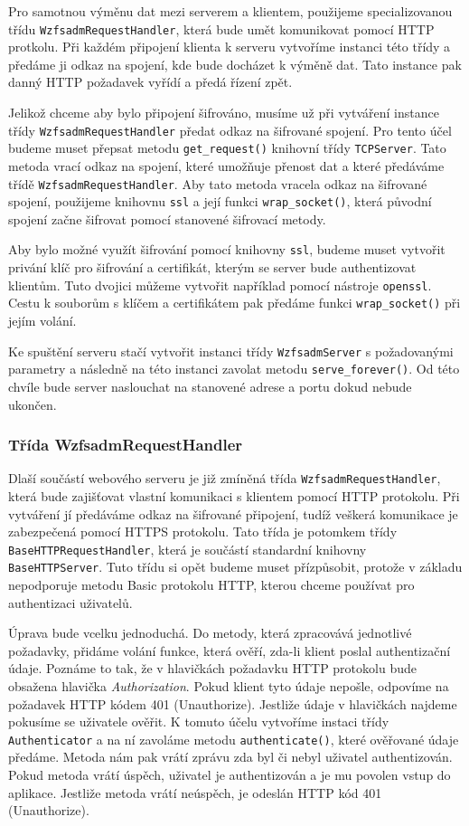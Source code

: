     Pro samotnou výměnu dat mezi serverem a klientem, použijeme specializovanou třídu \verb|WzfsadmRequestHandler|, která bude umět komunikovat pomocí HTTP protkolu. Při každém připojení klienta k serveru vytvoříme instanci této třídy a předáme ji odkaz na spojení, kde bude docházet k výměně dat. Tato instance pak danný HTTP požadavek vyřídí a předá řízení zpět.

    Jelikož chceme aby bylo připojení šifrováno, musíme už při vytváření instance třídy \verb|WzfsadmRequestHandler| předat odkaz na šifrované spojení. Pro tento účel budeme muset přepsat metodu \verb|get_request()| knihovní třídy \verb|TCPServer|. Tato metoda vrací odkaz na spojení, které umožňuje přenost dat a které předáváme třídě \verb|WzfsadmRequestHandler|. Aby tato metoda vracela odkaz na šifrované spojení, použijeme knihovnu \verb|ssl| a její funkci \verb|wrap_socket()|, která původní spojení začne šifrovat pomocí stanovené šifrovací metody.

    Aby bylo možné využít šifrování pomocí knihovny \verb|ssl|, budeme muset vytvořit privání klíč pro šifrování a certifikát, kterým se server bude authentizovat klientům. Tuto dvojici můžeme vytvořit například pomocí nástroje \verb|openssl|. Cestu k souborům s klíčem a certifikátem pak předáme funkci \verb|wrap_socket()| při jejím volání.

    Ke spuštění serveru stačí vytvořit instanci třídy \verb|WzfsadmServer| s požadovanými parametry a následně na této instanci zavolat metodu \verb|serve_forever()|. Od této chvíle bude server naslouchat na stanovené adrese a portu dokud nebude ukončen.


    \subsubsection{Třída WzfsadmRequestHandler}
    Dlaší součástí webového serveru je již zmíněná třída \verb|WzfsadmRequestHandler|, která bude zajišťovat vlastní komunikaci s klientem pomocí HTTP protokolu. Při vytváření jí předáváme odkaz na šifrované připojení, tudíž veškerá komunikace je zabezpečená pomocí HTTPS protokolu. Tato třída je potomkem třídy \verb|BaseHTTPRequestHandler|, která je součástí standardní knihovny \verb|BaseHTTPServer|. Tuto třídu si opět budeme muset přízpůsobit, protože v základu nepodporuje metodu Basic protokolu HTTP, kterou chceme používat pro authentizaci uživatelů.

    Úprava bude vcelku jednoduchá. Do metody, která zpracovává jednotlivé požadavky, přidáme volání funkce, která ověří, zda-li klient poslal authentizační údaje. Poznáme to tak, že v hlavičkách požadavku HTTP protokolu bude obsažena hlavička \emph{Authorization}. Pokud klient tyto údaje nepošle, odpovíme na požadavek HTTP kódem 401 (Unauthorize). Jestliže údaje v hlavičkách najdeme pokusíme se uživatele ověřit. K tomuto účelu vytvoříme instaci třídy \verb|Authenticator| a na ní zavoláme metodu \verb|authenticate()|, které ověřované údaje předáme. Metoda nám pak vrátí zprávu zda byl či nebyl uživatel authentizován. Pokud metoda vrátí úspěch, uživatel je authentizován a je mu povolen vstup do aplikace. Jestliže metoda vrátí neúspěch, je odeslán HTTP kód 401 (Unauthorize).


